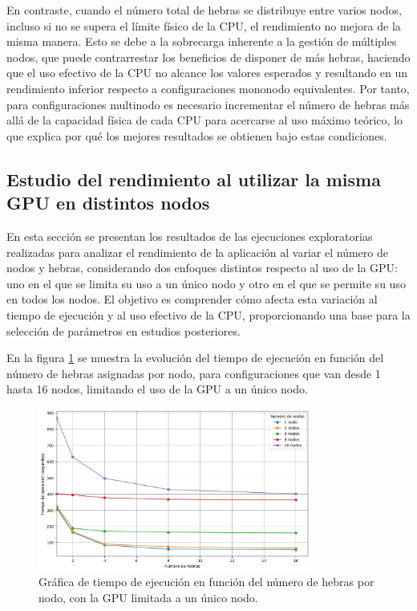 En contraste, cuando el número total de hebras se distribuye entre varios nodos, incluso si no se supera el límite físico de la CPU, el rendimiento no mejora de la misma manera. Esto se debe a la sobrecarga inherente a la gestión de múltiples nodos, que puede contrarrestar los beneficios de disponer de más hebras, haciendo que el uso efectivo de la CPU no alcance los valores esperados y resultando en un rendimiento inferior respecto a configuraciones mononodo equivalentes. Por tanto, para configuraciones multinodo es necesario incrementar el número de hebras más allá de la capacidad física de cada CPU para acercarse al uso máximo teórico, lo que explica por qué los mejores resultados se obtienen bajo estas condiciones.

\subsection{Estudio del rendimiento al utilizar la misma GPU en distintos nodos}

En esta sección se presentan los resultados de las ejecuciones exploratorias realizadas para analizar el rendimiento de la aplicación al variar el número de nodos y hebras, considerando dos enfoques distintos respecto al uso de la GPU: uno en el que se limita su uso a un único nodo y otro en el que se permite su uso en todos los nodos. El objetivo es comprender cómo afecta esta variación al tiempo de ejecución y al uso efectivo de la CPU, proporcionando una base para la selección de parámetros en estudios posteriores.

En la figura \ref{fig:exploratory_gpu_limit_time} se muestra la evolución del tiempo de ejecución en función del número de hebras asignadas por nodo, para configuraciones que van desde 1 hasta 16 nodos, limitando el uso de la GPU a un único nodo.

\begin{figure}[ht]
    \centering
    \includegraphics[width=0.8\textwidth]{imagenes/cap5/exploratory_gpu_limit_time.png}
    \caption{Gráfica de tiempo de ejecución en función del número de hebras por nodo, con la GPU limitada a un único nodo.}
    \label{fig:exploratory_gpu_limit_time}
\end{figure}

